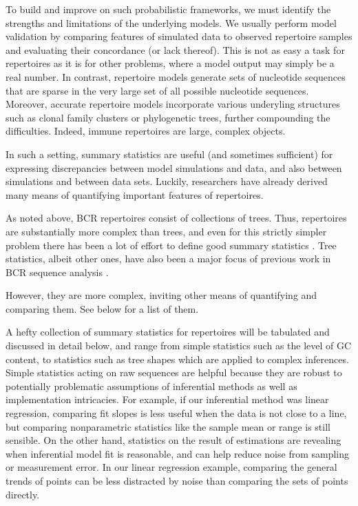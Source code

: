 \documentclass{article}
\begin{document}
To build and improve on such probabilistic frameworks, we must identify the strengths and limitations of the underlying models.
We usually perform model validation by comparing features of simulated data to observed repertoire samples and evaluating their concordance (or lack thereof).
This is not as easy a task for repertoires as it is for other problems, where a model output may simply be a real number.
In contrast, repertoire models generate sets of nucleotide sequences that are sparse in the very large set of all possible nucleotide sequences.
Moreover, accurate repertoire models incorporate various underyling structures such as clonal family clusters or phylogenetic trees, further compounding the difficulties.
Indeed, immune repertoires are large, complex objects.

In such a setting, summary statistics are useful (and sometimes sufficient) for expressing discrepancies between model simulations and data, and also between simulations and between data sets.
Luckily, researchers have already derived many means of quantifying important features of repertoires.

As noted above, BCR repertoires consist of collections of trees.
Thus, repertoires are substantially more complex than trees, and even for this strictly simpler problem there has been a lot of effort to define good summary statistics \cite{Mooers1997-jl}.
Tree statistics, albeit other ones, have also been a major focus of previous work in BCR sequence analysis \cite{Dunn-Walters2004-hv,Mehr2004-ej,Steiman-Shimony2006-fm,Shahaf2008-cc}.

However, they are more complex, inviting other means of quantifying and comparing them.
See below for a list of them.



A hefty collection of summary statistics for repertoires will be tabulated and discussed in detail below, and range from simple statistics such as the level of GC content, to statistics such as tree shapes which are applied to complex inferences.
Simple statistics acting on raw sequences are helpful because they are robust to potentially problematic assumptions of inferential methods as well as implementation intricacies.
For example, if our inferential method was linear regression, comparing fit slopes is less useful when the data is not close to a line, but comparing nonparametric statistics like the sample mean or range is still sensible.
On the other hand, statistics on the result of estimations are revealing when inferential model fit is reasonable, and can help reduce noise from sampling or measurement error.
In our linear regression example, comparing the general trends of points can be less distracted by noise than comparing the sets of points directly.
\end{document}
